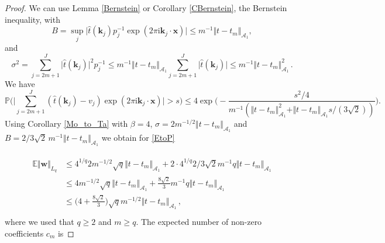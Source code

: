 \documentclass[11pt,reqno]{article}
\numberwithin{equation}{section}
\theoremstyle{definition}
\theoremstyle{plain}
\newcommand{\E}{\ensuremath{\mathbb{E}}}
\newcommand{\p}{\ensuremath{\mathbb{P}}}
\newcommand{\ca}{\ensuremath{\mathcal A}}
\newcommand{\bk}{\ensuremath{\mathbf k}}
\newcommand{\bx}{\ensuremath{\mathbf x}}
\newcommand{\bw}{\ensuremath{\mathbf w}}
\begin{document}
\begin{proof}
We can use Lemma \ref{Bernstein} or Corollary \ref{CBernstein}, the Bernstein inequality, with 
\[B =  \sup_j \vert\hat{t}(\bk_j) p_j^{-1} \exp(2 \pi \mathrm{i} \bk_j\cdot \bx) \vert \leq m^{-1} \Vert t-t_m \Vert_{\ca_1},\] 
and 
\[
\sigma^2 = \sum_{j=2m+1}^J \vert\hat{t}(\bk_j) \vert^2 p_j^{-1} \leq  m^{-1}\Vert t-t_m \Vert_{\ca_1} \sum_{j=2m+1}^J \vert\hat{t}(\bk_j) \vert \leq  m^{-1}\Vert t-t_m \Vert_{\ca_1}^2\,. \]
We have
\begin{equation}
    \p \Big( \Big\vert \sum_{j=2m+1}^J(\hat{t}(\bk_j) - v_j) \exp(2 \pi \mathrm{i} \bk_j\cdot \bx)\Big\vert > s \Big) \leq 4\exp\Big(- \frac{s^2/4}{ m^{-1} ( \Vert t-t_m \Vert_{\ca_1}^2 + \Vert t-t_m \Vert_{\ca_1} s/(3\sqrt{2}))} \Big).
\end{equation}
Using Corollary \ref{Mo_to_Ta} with \(\beta = 4\), \(\sigma = 2 m^{-1/2} \Vert t-t_m \Vert_{\ca_1}\) and \(B = 2/3 \sqrt{2}\, m^{-1} \Vert t-t_m \Vert_{\ca_1} \) we obtain for \eqref{EtoP} 

\begin{align} \label{nq}
\begin{split}
\E \Vert \bw \Vert_{L_q} &\leq 4^{1/q} 2 m^{-1/2} \sqrt{q} \Vert t-t_m \Vert_{\ca_1}  + 2 \cdot 4^{1/q} 2/3 \sqrt{2} m^{-1} q \Vert t-t_m \Vert_{\ca_1}  \\
& \leq 4 m^{-1/2} \sqrt{q} \Vert t-t_m \Vert_{\ca_1}  + \frac{8 \sqrt{2}}{3} m^{-1} q \Vert t-t_m \Vert_{\ca_1}  \\
& \leq  \Big(4 + \frac{8\sqrt{2}}{3} \Big) \sqrt{q} m^{-1/2} \Vert t-t_m \Vert_{\ca_1} \, ,\\
\end{split}
\end{align}
where we used that \(q \geq 2\) and $m\geq q$.
The expected number of non-zero coefficients \(c_m\) is 


\end{proof}
\end{document}
